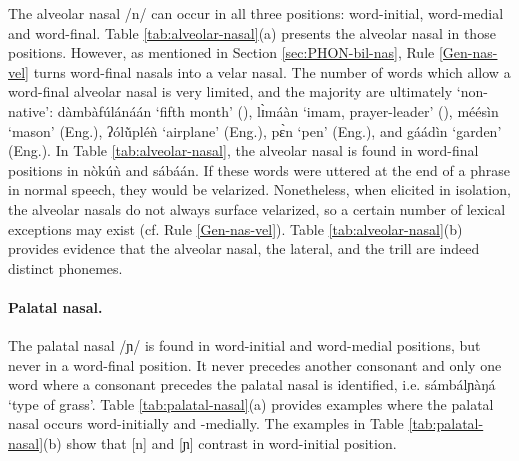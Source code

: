 The alveolar nasal  /{n}/ can occur in all three positions: word-initial, 
word-medial and word-final. Table \ref{tab:alveolar-nasal}(a) presents the 
alveolar nasal in those positions.  However,  as mentioned in Section 
\ref{sec:PHON-bil-nas}, Rule \ref{Gen-nas-vel} turns 
word-final 
nasals into a 
velar nasal. The number of words which allow a word-final alveolar nasal is very 
limited, and the majority are ultimately `non-native': {\sls 
dàmbàfúlánáán} `fifth month' (),  {\sls lɪ̀máàn} `imam, prayer-leader' (),  {\sls 
méésìn} 
`mason' (Eng.),  {\sls ʔólŭ̀pléǹ} `airplane' (Eng.),  {\sls pɛ̀n} `pen'  
(Eng.), 
and  {\sls gáádìn} `garden'  (Eng.). In Table \ref{tab:alveolar-nasal}, the 
alveolar nasal is found in word-final positions in  {\sls nòkúǹ} and {\sls  
sábáán}. If these words were  uttered at the end of a phrase in normal 
speech, they would be  velarized. Nonetheless, when elicited in isolation, the 
alveolar nasals  do not always surface velarized, so a certain number of lexical exceptions  may exist (cf. Rule \ref{Gen-nas-vel}). Table \ref{tab:alveolar-nasal}(b) 
provides 
evidence that the alveolar nasal, the lateral, and the trill  are indeed 
distinct phonemes.

 


\paragraph{Palatal nasal.}

The palatal nasal /{ɲ}/ is found in word-initial  and word-medial 
positions, but never in  a word-final position. It never precedes another 
consonant and only one word where a consonant precedes the palatal nasal is 
identified, i.e. {\sls sámbálɲàŋá} `type of grass'.  Table  
\ref{tab:palatal-nasal}(a) provides examples where the palatal nasal occurs word-initially and -medially. The examples in Table \ref{tab:palatal-nasal}(b)  show 
that [n] and [ɲ] contrast in word-initial position.  


